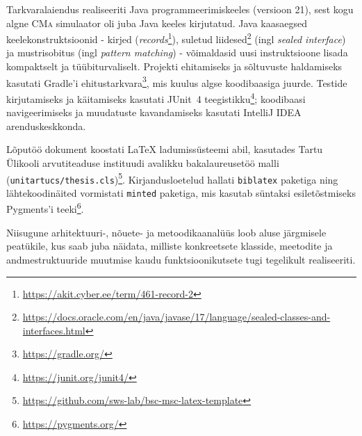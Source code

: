 Tarkvaralaiendus realiseeriti Java programmeerimiskeeles (versioon 21), sest kogu algne \textsc{CMa} simulaator oli juba Java keeles kirjutatud. Java kaasaegsed keelekonstruktsioonid - kirjed (\emph{records}\footnote{\url{https://akit.cyber.ee/term/461-record-2}}), suletud liidesed\footnote{\url{https://docs.oracle.com/en/java/javase/17/language/sealed-classes-and-interfaces.html}} (ingl \emph{sealed interface}) ja mustrisobitus (ingl \emph{pattern matching}) - võimaldasid uusi instruktsioone lisada kompaktselt ja tüübiturvaliselt. Projekti ehitamiseks ja sõltuvuste haldamiseks kasutati Gradle'i ehitustarkvara\footnote{\url{https://gradle.org/}}, mis kuulus algse koodibaasiga juurde. Testide kirjutamiseks ja käitamiseks kasutati JUnit~4 teegistikku\footnote{\url{https://junit.org/junit4/}}; koodibaasi navigeerimiseks ja muudatuste kavandamiseks kasutati IntelliJ IDEA arenduskeskkonda.

Lõputöö dokument koostati \LaTeX{} ladumissüsteemi abil, kasutades Tartu Ülikooli arvutiteaduse instituudi avalikku bakalaureusetöö malli (\texttt{unitartucs/thesis.cls})\footnote{\url{https://github.com/sws-lab/bsc-msc-latex-template}}. Kirjandusloetelud hallati \texttt{biblatex} paketiga ning lähtekoodinäited vormistati \texttt{minted} paketiga, mis kasutab süntaksi esiletõstmiseks Pygments'i teeki\footnote{\url{https://pygments.org/}}.


Niisugune arhitektuuri-, nõuete- ja metoodikaanalüüs loob aluse järgmisele peatükile, kus saab juba näidata, milliste konkreetsete klasside, meetodite ja andmestruktuuride muutmise kaudu funktsioonikutsete tugi tegelikult realiseeriti.